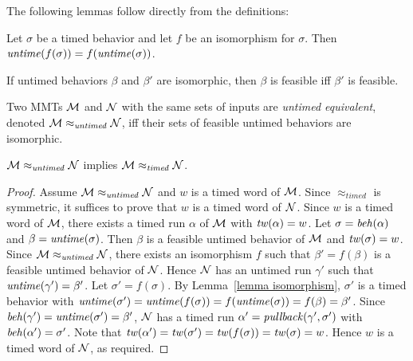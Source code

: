 The following lemmas follow directly from the definitions:
\begin{lemma}
\label{lemma isomorphism}
Let $\sigma$ be a timed behavior and let $f$ be an isomorphism for $\sigma$.
Then $\mathit{untime}(f(\sigma)) = f(\mathit{untime}(\sigma))$.
\end{lemma}
\begin{lemma}
If untimed behaviors $\beta$ and $\beta'$ are isomorphic, then $\beta$ is feasible iff $\beta'$ is feasible.
\end{lemma}

Two MMTs ${\cal M}$ and ${\cal N}$ with the same sets of inputs are \emph{untimed equivalent}, denoted ${\cal M} \approx_{\mathit{untimed}} {\cal N}$, iff their sets of feasible untimed behaviors are isomorphic.

\begin{theorem}
\label{untimedimpliestimed}
${\cal M} \approx_{\mathit{untimed}} {\cal N}$
implies
${\cal M} \approx_{\mathit{timed}} {\cal N}$.
\end{theorem}
\begin{proof}
Assume ${\cal M} \approx_{\mathit{untimed}} {\cal N}$ and $w$ is a timed word of ${\cal M}$.
Since $\approx_{\mathit{timed}}$ is symmetric, it suffices to prove that $w$ is a timed word of ${\cal N}$.
Since $w$ is a timed word of ${\cal M}$,
there exists a timed run $\alpha$ of ${\cal M}$ with $\mathit{tw}(\alpha) = w$. 
Let $\sigma = \mathit{beh}(\alpha)$ and $\beta = \mathit{untime}(\sigma)$. 
Then $\beta$ is a feasible untimed behavior of ${\cal M}$ and $\mathit{tw}(\sigma) = w$.
Since  ${\cal M} \approx_{\mathit{untimed}} {\cal N}$, there exists an isomorphism $f$ such that 
$\beta' = f(\beta)$ is a feasible untimed behavior of ${\cal N}$.
Hence ${\cal N}$ has an untimed run $\gamma'$ such that $\mathit{untime}(\gamma') = \beta'$.
Let $\sigma' = f(\sigma)$.
By Lemma~\ref{lemma isomorphism}, $\sigma'$ is a timed behavior with 
$\mathit{untime}(\sigma') = \mathit{untime}(f(\sigma)) = f(\mathit{untime}(\sigma)) = f(\beta) = \beta'$.
Since $\mathit{beh}(\gamma') = \mathit{untime}(\sigma') = \beta'$, ${\cal N}$ has a timed run $\alpha' = \mathit{pullback}(\gamma',\sigma')$ with
$\mathit{beh}(\alpha') = \sigma'$.
Note that $\mathit{tw}(\alpha') = \mathit{tw}(\sigma') = \mathit{tw}(f(\sigma)) = \mathit{tw}(\sigma) = w$.
Hence $w$ is a timed word of ${\cal N}$, as required.
\end{proof}

